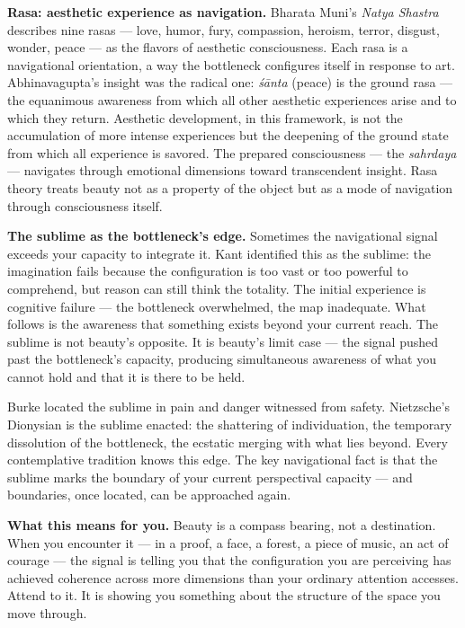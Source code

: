 \textbf{Rasa: aesthetic experience as navigation.} Bharata Muni's \textit{Natya Shastra} describes nine rasas — love, humor, fury, compassion, heroism, terror, disgust, wonder, peace — as the flavors of aesthetic consciousness. Each rasa is a navigational orientation, a way the bottleneck configures itself in response to art. Abhinavagupta's insight was the radical one: \textit{śānta} (peace) is the ground rasa — the equanimous awareness from which all other aesthetic experiences arise and to which they return. Aesthetic development, in this framework, is not the accumulation of more intense experiences but the deepening of the ground state from which all experience is savored. The prepared consciousness — the \textit{sahrdaya} — navigates through emotional dimensions toward transcendent insight. Rasa theory treats beauty not as a property of the object but as a mode of navigation through consciousness itself.


\textbf{The sublime as the bottleneck's edge.} Sometimes the navigational signal exceeds your capacity to integrate it. Kant identified this as the sublime: the imagination fails because the configuration is too vast or too powerful to comprehend, but reason can still think the totality. The initial experience is cognitive failure — the bottleneck overwhelmed, the map inadequate. What follows is the awareness that something exists beyond your current reach. The sublime is not beauty's opposite. It is beauty's limit case — the signal pushed past the bottleneck's capacity, producing simultaneous awareness of what you cannot hold and that it is there to be held.


Burke located the sublime in pain and danger witnessed from safety. Nietzsche's Dionysian is the sublime enacted: the shattering of individuation, the temporary dissolution of the bottleneck, the ecstatic merging with what lies beyond. Every contemplative tradition knows this edge. The key navigational fact is that the sublime marks the boundary of your current perspectival capacity — and boundaries, once located, can be approached again.


\textbf{What this means for you.} Beauty is a compass bearing, not a destination. When you encounter it — in a proof, a face, a forest, a piece of music, an act of courage — the signal is telling you that the configuration you are perceiving has achieved coherence across more dimensions than your ordinary attention accesses. Attend to it. It is showing you something about the structure of the space you move through.


